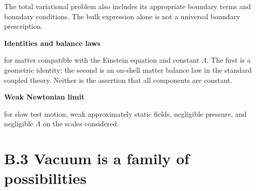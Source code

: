 \documentclass[
  11pt,
  letterpaper,
  oneside,
  openany]{scrbook}
\begin{document}
The total variational problem also includes its appropriate boundary
terms and boundary conditions. The bulk expression alone is not a
universal boundary prescription.

\textbf{Identities and balance laws}

\begin{center}
\begingroup
{}
\ifdim\wd\grmathbox>\linewidth
\resizebox{\linewidth}{!}{\usebox{\grmathbox}}
\else\usebox{\grmathbox}\fi
\endgroup
\end{center}

for matter compatible with the Einstein equation and constant
\(\Lambda\). The first is a geometric identity; the second is an
on-shell matter balance law in the standard coupled theory. Neither is
the assertion that all components are constant.

\textbf{Weak Newtonian limit}

\begin{center}
\begingroup
{}
\ifdim\wd\grmathbox>\linewidth
\resizebox{\linewidth}{!}{\usebox{\grmathbox}}
\else\usebox{\grmathbox}\fi
\endgroup
\end{center}

for slow test motion, weak approximately static fields, negligible
pressure, and negligible \(\Lambda\) on the scales considered.

\hypertarget{b.3-vacuum-is-a-family-of-possibilities}{%
\section{B.3 Vacuum is a family of
possibilities}\label{b.3-vacuum-is-a-family-of-possibilities}}

\begingroup\small\setlength{\tabcolsep}{5pt}\renewcommand{\arraystretch}{1.13}
\end{document}
